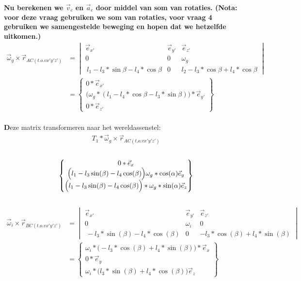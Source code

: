 \documentclass[a4paper,10pt]{article}
\begin{document}
\textbf{Nu berekenen we $\vec{v}_c$ en $\vec{a}_c$ door middel van som van rotaties. (Nota: voor deze vraag gebruiken we som van rotaties, voor vraag 4 gebruiken we samengestelde beweging en hopen dat we hetzelfde uitkomen.)}
\begin{equation}
	\begin{aligned}
		\vec{\omega}_g \times \vec{r}_{AC(t.o.v x'y'z')} & = \begin{vmatrix}
			\vec{e}_{x'}& \vec{e}_{y'} & \vec{e}_{z'}\\
			0 & 0 & \omega_g \\
			\ l_1 - l_3 * \sin{\beta} - l_4*\cos{\beta} & 0 & l_2 - l_3 * \cos{\beta} + l_4 * \cos{\beta}\end{vmatrix}\\
		&= \begin{Bmatrix}
			0 *\vec{e}_{x'}\\
			\Big(\omega_g*(l_1-l_4*\cos{\beta} - l_3 * \sin{\beta})\Big)*\vec{e}_{y'}\\
			0 * \vec{e}_{z'}
		\end{Bmatrix}
	\end{aligned}
\end{equation}\\
\textbf Deze matrix transformeren naar het wereldassenstel:\
\begin{equation}
	\begin{aligned}
		{T}_{1}* \vec{\omega}_g \times \vec{r}_{AC(t.o.v x'y'z')}
	\end{aligned}
\end{equation}\\
\begin{equation}
	\begin{Bmatrix}
		{0*\vec{e}_{x}}\\
		\Big(l_1-l_3\sin(\beta)-l_4\cos(\beta)\Big)\omega_g*\cos(\alpha) \vec{e}_{y}\\
		\Big{(l_1-l_3\sin(\beta)-l_4\cos(\beta)\Big)*\omega_g*\sin(\alpha)\vec{e}_{z}}
	\end{Bmatrix}
\end{equation}\\
\begin{equation}
	\begin{aligned}
		\vec{\omega}_i \times \vec{r}_{BC(t.o.v x'y'z')} & = \begin{vmatrix}
			\vec{e}_{x'}& \vec{e}_{y'} & \vec{e}_{z'}\\
			0 & \omega_i & 0 \\
			\  -l_3 * \sin(\beta) - l_4 * \cos(\beta) & 0 &  -l_3*\cos(\beta) + l_4 *\sin(\beta)
		\end{vmatrix}\\
		&= \begin{Bmatrix}
			\omega_i*\Big(-l_3*\cos(\beta) + l_4 *\sin(\beta)\Big) *\vec{e}_{x}\\
			0*\vec{e}_{y}\\
			\omega_i*\Big(l_3 * \sin(\beta) + l_4 * \cos(\beta)\Big) \vec{e}_{z}
		\end{Bmatrix}
	\end{aligned}
\end{equation}\\
\end{document}
